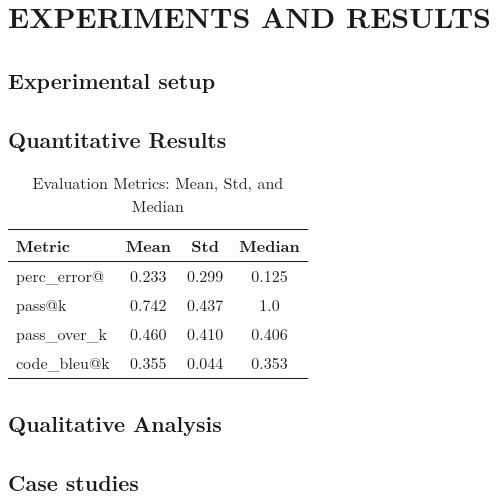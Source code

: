 \chapter{ EXPERIMENTS AND RESULTS}


\section{Experimental setup}

\section{Quantitative Results}

\begin{table}[h!]
\centering
\caption{Evaluation Metrics: Mean, Std, and Median}
{%
\begin{tabular}{l|ccc}
\toprule
\textbf{Metric} & \textbf{Mean} & \textbf{Std} & \textbf{Median} \\
\midrule
perc\_error@ & 0.233 & 0.299 & 0.125 \\
pass@k    & 0.742 & 0.437 & 1.0   \\
pass\_over\_k  & 0.460 & 0.410 & 0.406 \\
code\_bleu@k  & 0.355 & 0.044 & 0.353 \\
\bottomrule
\end{tabular}
}
\label{tab:metrics_generated}
\end{table}

\section{Qualitative Analysis}


\section{Case studies}


